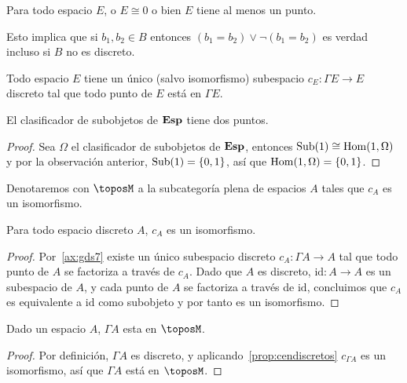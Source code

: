 \begin{axioma}[label=ax:gds6]
Para todo espacio $E$, o $E \cong  0 $ o bien $E$ tiene al menos un punto.
\end{axioma}

Esto implica que si $b_1, b_2\in B$ entonces $(b_1=b_2)\lor \lnot(b_1=b_2)$ es verdad incluso si $B$ no es discreto.

\begin{axioma}[label=ax:gds7]
Todo espacio $E$ tiene un único (salvo isomorfismo) subespacio $c_E\colon\Gamma E\to E$ discreto tal que todo punto de $E$ está en $\Gamma E$. 
\end{axioma} 

\begin{corollary}[label=cor:bivaluado]
  El clasificador de subobjetos de $\mathbf{Esp}$ tiene dos puntos.
\end{corollary}
\begin{proof}
  Sea $\Omega$ el clasificador de subobjetos de $\mathbf{Esp}$, entonces $\operatorname{Sub}(1)\cong \operatorname{Hom}(1,\Omega)$
  y por la observación anterior, $\operatorname{Sub}(1)=\{0,1\}$, así que $\operatorname{Hom}(1,\Omega)=\{0,1\}$.
\end{proof}

\begin{definition}
  Denotaremos con $\toposM$ a la subcategoría plena de espacios $A$ tales que $c_A$ es un isomorfismo.
\end{definition}

\begin{proposition}[label=prop:cendiscretos]
  Para todo espacio discreto $A$, $c_A$ es un isomorfismo.
\end{proposition}
\begin{proof}
 Por~\ref{ax:gds7} existe un único subespacio discreto $c_A\colon\Gamma A\to A$ tal que todo punto de $A$ se factoriza a través de $c_A$.
  Dado que $A$ es discreto, $\text{id}\colon A\to A$ es un subespacio de $A$, y cada punto de $A$ se factoriza a través de $\text{id}$, concluimos que $c_A$
  es equivalente a $\text{id}$ como subobjeto y por tanto es un isomorfismo.
\end{proof}

\begin{corollary}[label=cor:gammaenM]
  Dado un espacio $A$, $\Gamma A$ esta en $\toposM$.
\end{corollary}
\begin{proof}
  Por definición, $\Gamma A$ es discreto, y aplicando~\ref{prop:cendiscretos} $c_{\Gamma A}$
  es un isomorfismo, así que $\Gamma A$ está en $\toposM$.
\end{proof}

